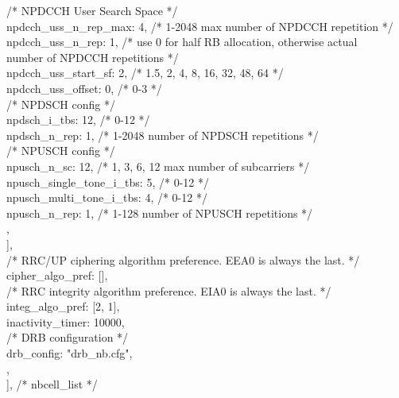 {{{          /* NPDCCH User Search Space */\\
          npdcch\_uss\_n\_rep\_max: 4, /* 1-2048 max number of NPDCCH repetition */\\
          npdcch\_uss\_n\_rep: 1, /* use 0 for half RB allocation, otherwise actual\\
                                  number of NPDCCH repetitions */\\
          npdcch\_uss\_start\_sf: 2, /* 1.5, 2, 4, 8, 16, 32, 48, 64 */\\
          npdcch\_uss\_offset: 0, /* 0-3 */\\
          /* NPDSCH config */\\
          npdsch\_i\_tbs: 12, /* 0-12 */\\
          npdsch\_n\_rep: 1, /* 1-2048 number of NPDSCH repetitions */\\
          /* NPUSCH config */\\
          npusch\_n\_sc: 12, /* 1, 3, 6, 12 max number of subcarriers */\\
          npusch\_single\_tone\_i\_tbs: 5, /* 0-12 */\\
          npusch\_multi\_tone\_i\_tbs: 4, /* 0-12 */\\
          npusch\_n\_rep: 1, /* 1-128 number of NPUSCH repetitions */\\
        },\\
      ],\\

      /* RRC/UP ciphering algorithm preference. EEA0 is always the last. */\\
      cipher\_algo\_pref: [],\\
      /* RRC integrity algorithm preference. EIA0 is always the last. */\\
      integ\_algo\_pref: [2, 1],\\

      inactivity\_timer: 10000,\\

      /* DRB configuration */\\
      drb\_config: "drb\_nb.cfg",\\
    },\\
  ], /* nbcell\_list */\\
}\\
